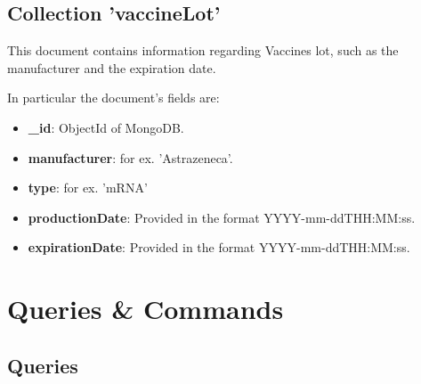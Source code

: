 \documentclass{article}[IEEEtran]
\begin{document}
\subsection{Collection 'vaccineLot'}

This document contains information regarding Vaccines lot, such as the manufacturer and the expiration date.

In particular the document's fields are:

\begin{itemize}
    \item \textbf{\_id}: ObjectId of MongoDB.
    \item \textbf{manufacturer}: for ex. 'Astrazeneca'.
    \item \textbf{type}: for ex. 'mRNA'
    \item \textbf{productionDate}: Provided in the format YYYY-mm-ddTHH:MM:ss.
    \item \textbf{expirationDate}: Provided in the format YYYY-mm-ddTHH:MM:ss.
\end{itemize}

\section{Queries \& Commands}\label{cmd-que}

\subsection{Queries}
\end{document}
